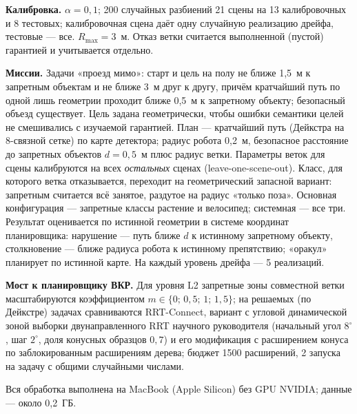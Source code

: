 \textbf{Калибровка.} $\alpha = 0{,}1$; 200 случайных разбиений 21 сцены на 13 калибровочных и 8 тестовых; калибровочная сцена даёт одну случайную реализацию дрейфа, тестовые --- все. $R_{\max} = 3$~м. Отказ ветки считается выполненной (пустой) гарантией и учитывается отдельно.

\textbf{Миссии.} Задачи «проезд мимо»: старт и цель на полу не ближе 1{,}5~м к запретным объектам и не ближе 3~м друг к другу, причём кратчайший путь по одной лишь геометрии проходит ближе 0{,}5~м к запретному объекту; безопасный объезд существует. Цель задана геометрически, чтобы ошибки семантики целей не смешивались с изучаемой гарантией. План --- кратчайший путь (Дейкстра на 8-связной сетке) по карте детектора; радиус робота 0{,}2~м, безопасное расстояние до запретных объектов $d = 0{,}5$~м плюс радиус ветки. Параметры веток для сцены калибруются на всех \emph{остальных} сценах (leave-one-scene-out). Класс, для которого ветка отказывается, переходит на геометрический запасной вариант: запретным считается всё занятое, раздутое на радиус «только поза». Основная конфигурация --- запретные классы растение и велосипед; системная --- все три. Результат оценивается по истинной геометрии в системе координат планировщика: нарушение --- путь ближе $d$ к истинному запретному объекту, столкновение --- ближе радиуса робота к истинному препятствию; «оракул» планирует по истинной карте. На каждый уровень дрейфа --- 5 реализаций.

\textbf{Мост к планировщику ВКР.} Для уровня L2 запретные зоны совместной ветки масштабируются коэффициентом $m \in \{0;\,0{,}5;\,1;\,1{,}5\}$; на решаемых (по Дейкстре) задачах сравниваются RRT-Connect, вариант с угловой динамической зоной выборки двунаправленного RRT научного руководителя (начальный угол $8^\circ$, шаг $2^\circ$, доля конусных образцов $0{,}7$) и его модификация с расширением конуса по заблокированным расширениям дерева; бюджет 1500 расширений, 2 запуска на задачу с общими случайными числами.

Вся обработка выполнена на MacBook (Apple Silicon) без GPU NVIDIA; данные --- около 0{,}2~ГБ.

